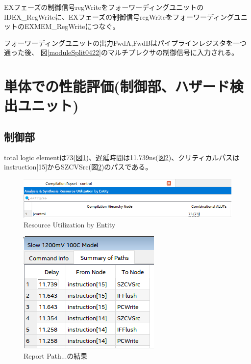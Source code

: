 \documentclass[a4j,titlepage]{jarticle}
\begin{document}
EXフェーズの制御信号regWriteをフォーワーディングユニットのIDEX\_RegWriteに、EXフェーズの制御信号regWriteをフォーワーディングユニットのEXMEM\_RegWriteにつなぐ。

フォーワーディングユニットの出力FwdA,FwdBはパイプラインレジスタを一つ通った後、
図\ref{moduleSplit0422}のマルチプレクサの制御信号に入力される。

\section{単体での性能評価(制御部、ハザード検出ユニット)}
\subsection{制御部}
total logic elementは73(図\ref{controltotallogicelement0603})、遅延時間は11.739ns(図\ref{controlreportpath})、クリティカルパスはinstruction[15]からSZCVSrc(図\ref{controlreportpath})のパスである。


\begin{figure}[H]
    \begin{center}
    \includegraphics[scale = 0.62]{controltotallogicelement0603.PNG}
    \end{center}
    \caption{Resource Utilization by Entity}
    \label{controltotallogicelement0603}
\end{figure}

\begin{figure}[H]
    \begin{center}
    \includegraphics[scale = 1.2]{controlreportpath.PNG}
    \end{center}
    \caption{Report Path...の結果}
    \label{controlreportpath}
\end{figure}
\end{document}
